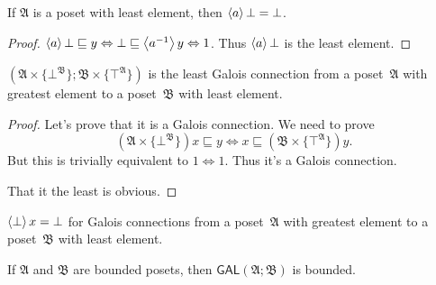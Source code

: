 
\begin{prop}\label{a-bot}
If $\mathfrak{A}$ is a poset with least element, then $\left\langle a\right\rangle\bot=\bot$.
\end{prop}

\begin{proof}
$\left\langle a\right\rangle\bot\sqsubseteq y\Leftrightarrow \bot\sqsubseteq\left\langle a^{-1}\right\rangle y\Leftrightarrow 1$.
Thus $\left\langle a\right\rangle\bot$ is the least element.
\end{proof}

\begin{prop}
$(\mathfrak{A}\times\{\bot^\mathfrak{B}\}; \mathfrak{B}\times\{\top^\mathfrak{A}\})$ is the least Galois connection from
a poset~$\mathfrak{A}$ with greatest element to a poset~$\mathfrak{B}$ with least element.
\end{prop}

\begin{proof}
Let's prove that it is a Galois connection. We need to prove
\[ (\mathfrak{A}\times\{\bot^\mathfrak{B}\})x\sqsubseteq y \Leftrightarrow x\sqsubseteq (\mathfrak{B}\times\{\top^\mathfrak{A}\})y. \]
But this is trivially equivalent to $1\Leftrightarrow 1$. Thus it's a Galois connection.

That it the least is obvious.
\end{proof}

\begin{cor}
$\left\langle \bot\right\rangle x=\bot$ for Galois connections from
a poset~$\mathfrak{A}$ with greatest element to a poset~$\mathfrak{B}$ with least element.
\end{cor}

\begin{thm}
If $\mathfrak{A}$ and $\mathfrak{B}$ are bounded posets, then $\mathsf{GAL}(\mathfrak{A}; \mathfrak{B})$ is bounded.
\end{thm}

